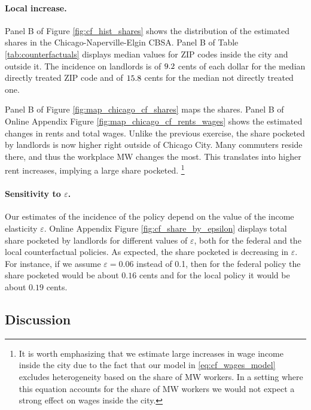\paragraph{Local increase.}

Panel B of Figure \ref{fig:cf_hist_shares} shows the distribution of the 
estimated shares in the Chicago-Naperville-Elgin CBSA.
Panel B of Table \ref{tab:counterfactuals} displays median values for ZIP codes
inside the city and outside it.
The incidence on landlords is of $\textnormal{9.2}$ cents of each 
dollar for the median directly treated ZIP code and of 
$\textnormal{15.8}$ cents for the median not directly treated one.

Panel B of Figure \ref{fig:map_chicago_cf_shares} maps the shares.
Panel B of Online Appendix Figure \ref{fig:map_chicago_cf_rents_wages} shows the 
estimated changes in rents and total wages.
Unlike the previous exercise, the share pocketed by landlords is now higher 
right outside of Chicago City.
Many commuters reside there, and thus the workplace MW changes the most.
This translates into higher rent increases, implying a large share pocketed.%
\footnote{It is worth emphasizing that we estimate large increases in wage income
inside the city due to the fact that our model in \eqref{eq:cf_wages_model}
excludes heterogeneity based on the share of MW workers.
In a setting where this equation accounts for the share of MW workers we would 
not expect a strong effect on wages inside the city.} 

\paragraph{Sensitivity to $\varepsilon$.}

Our estimates of the incidence of the policy depend on the value of the
income elasticity $\varepsilon$.
Online Appendix Figure \ref{fig:cf_share_by_epsilon} displays total share 
pocketed by landlords for different values of $\varepsilon$, both for the 
federal and the local counterfactual policies.
As expected, the share pocketed is decreasing in $\varepsilon$.
For instance, if we assume $\varepsilon = 0.06$ instead of 0.1, then
for the federal policy the share pocketed would be about $0.16$ cents and
for the local policy it would be about $0.19$ cents.

\subsection{Discussion}\label{sec:discussion_cf}


